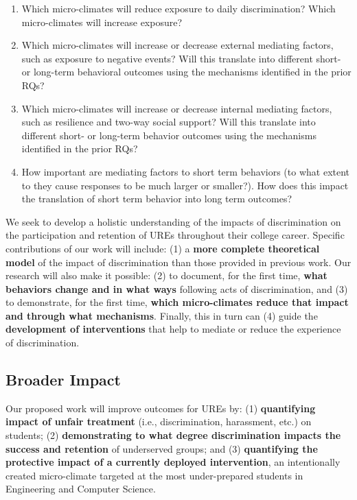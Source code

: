 \begin{enumerate}[start=7,label={\bfseries RQ\arabic*}, leftmargin=1cm]
    \item \label{itm:mc-daily-discrimination} Which micro-climates will reduce exposure to daily discrimination? Which micro-climates will increase exposure?

    \item \label{itm:mc-external-mediators} Which micro-climates will increase or decrease external mediating factors, such as exposure to negative events? Will this translate into different short- or long-term behavioral outcomes using the mechanisms identified in the prior RQs?
    \item \label{itm:mc-internal-mediators} Which micro-climates will increase or decrease internal mediating factors, such as resilience and two-way social support? Will this translate into different short- or long-term behavior outcomes using the mechanisms identified in the prior RQs?
    \item \label{itm:mc-mediators-behavior} How important are mediating factors to short term behaviors (to what extent to they cause responses to be much larger or smaller?). How does this impact the translation of short term behavior into long term outcomes?
\end{enumerate}
 
We seek to develop a holistic understanding of the impacts of discrimination on the participation and retention of UREs throughout  their college career. Specific contributions of our work will include: (1) a \textbf{more complete theoretical model} of the impact of discrimination than those provided in previous work.  Our research will also make it possible: (2) to document, for the first time, \textbf{what behaviors change and in what ways} following acts of discrimination, and (3) to demonstrate, for the first time, \textbf{which micro-climates reduce that impact and through what mechanisms}. Finally, this in turn can (4) guide the \textbf{development of interventions }that help to mediate or reduce the experience of discrimination.  

\subsection{Broader Impact}
\noindent
Our proposed work will improve outcomes for UREs by: (1) \textbf{quantifying impact of unfair treatment} (i.e., discrimination, harassment, etc.)  on students; (2) \textbf{demonstrating to what degree discrimination impacts the success and retention} of underserved groups; and (3) \textbf{quantifying the protective impact of a currently deployed intervention}, an intentionally created micro-climate targeted at the most under-prepared  students in Engineering and Computer Science. 

